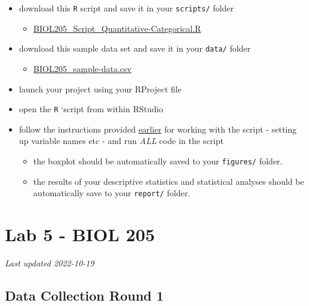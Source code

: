 \documentclass[
]{book}
\providecommand{\tightlist}{%
  \setlength{\itemsep}{0pt}\setlength{\parskip}{0pt}}
\begin{document}
\begin{itemize}
\tightlist
\item
  download this \texttt{R} script and save it in your \texttt{scripts/} folder

  \begin{itemize}
  \tightlist
  \item
    \href{https://osf.io/download/46mpk}{BIOL205\_Script\_Quantitative-Categorical.R}
  \end{itemize}
\item
  download this sample data set and save it in your \texttt{data/} folder

  \begin{itemize}
  \tightlist
  \item
    \href{https://osf.io/download/3r76k}{BIOL205\_sample-data.csv}
  \end{itemize}
\item
  launch your project using your RProject file
\item
  open the \texttt{R} `script from within RStudio
\item
  follow the instructions provided \href{https://ubco-biology.github.io/BIOL-205-Lab-Manual/using-the-rscripts.html}{earlier} for working with the script - setting up variable names etc - and run \emph{ALL} code in the script

  \begin{itemize}
  \tightlist
  \item
    the boxplot should be automatically saved to your \texttt{figures/} folder.
  \item
    the results of your descriptive statistics and statistical analyses should be automatically save to your \texttt{report/} folder.
  \end{itemize}
\end{itemize}

\hypertarget{part-lab-5---biol-205}{%
\part*{Lab 5 - BIOL 205}\label{part-lab-5---biol-205}}

\emph{Last updated 2022-10-19}

\hypertarget{data-collection-round-1}{%
\chapter*{Data Collection Round 1}\label{data-collection-round-1}}
\end{document}
